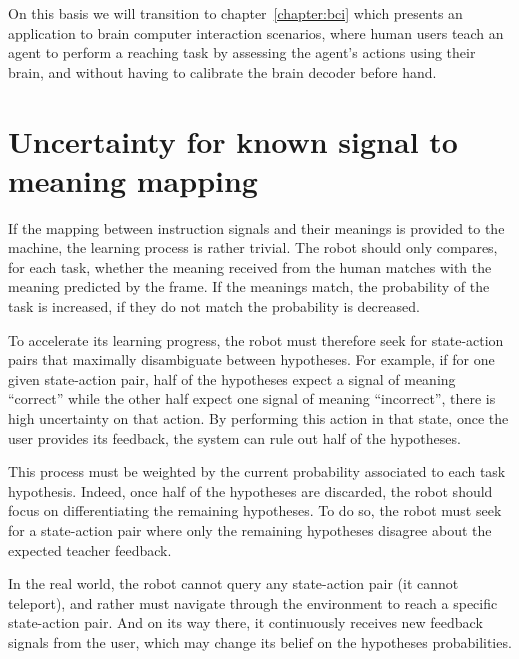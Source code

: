 On this basis we will transition to chapter~\ref{chapter:bci} which presents an application to brain computer interaction scenarios, where human users teach an agent to perform a reaching task by assessing the agent's actions using their brain, and without having to calibrate the brain decoder before hand.

\section{Uncertainty for known signal to meaning mapping}


If the mapping between instruction signals and their meanings is provided to the machine, the learning process is rather trivial. The robot should only compares, for each task, whether the meaning received from the human matches with the meaning predicted by the frame. If the meanings match, the probability of the task is increased, if they do not match the probability is decreased.

To accelerate its learning progress, the robot must therefore seek for state-action pairs that maximally disambiguate between hypotheses. For example, if for one given state-action pair, half of the hypotheses expect a signal of meaning ``correct'' while the other half expect one signal of meaning ``incorrect'', there is high uncertainty on that action. By performing this action in that state, once the user provides its feedback, the system can rule out half of the hypotheses.

This process must be weighted by the current probability associated to each task hypothesis. Indeed, once half of the hypotheses are discarded, the robot should focus on differentiating the remaining hypotheses. To do so, the robot must seek for a state-action pair where only the remaining hypotheses disagree about the expected teacher feedback.

In the real world, the robot cannot query any state-action pair (it cannot teleport), and rather must navigate through the environment to reach a specific state-action pair. And on its way there, it continuously receives new feedback signals from the user, which may change its belief on the hypotheses probabilities.

